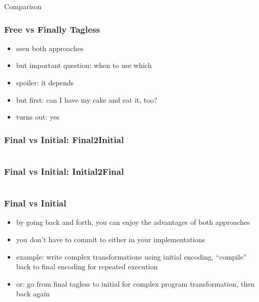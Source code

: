 \documentclass[aspectratio=169, hyperref={colorlinks, linkcolor=beamer@centricgreen}, urlcolor=links]{beamer}
\begin{document}
\begin{frame}
  \begin{center}
    \Huge
    Comparison
  \end{center}
\end{frame}

\begin{frame}
  \frametitle{Free vs Finally Tagless}
  \begin{itemize}
  \item seen both approaches
  \item but important question: when to use which
  \item spoiler: it depends
  \item but first: can I have my cake and eat it, too?
  \item turns out: yes
  \end{itemize}
\end{frame}

\begin{frame}[fragile]
  \frametitle{Final vs Initial: Final2Initial}
  \inputminted[fontsize=\footnotesize]{scala}{snippets/final-to-initial.scala}
\end{frame}

\begin{frame}[fragile]
  \frametitle{Final vs Initial: Initial2Final}
  \inputminted[fontsize=\footnotesize]{scala}{snippets/initial-to-final.scala}
\end{frame}

\begin{frame}
  \frametitle{Final vs Initial}
  \begin{itemize}
  \item by going back and forth, you can enjoy the advantages of both approaches
  \item you don't have to commit to either in your implementations
  \item example: write complex transformations using initial encoding,
    ``compile'' back to final encoding for repeated execution
  \item or: go from final tagless to initial for complex program
    transformation, then back again
  \end{itemize}
\end{frame}
\end{document}
